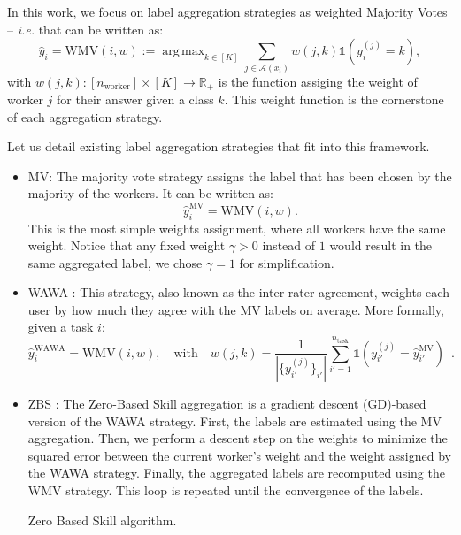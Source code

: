 \documentclass{cap2024}
\DeclareMathOperator*{\argmax}{arg\,max}
\begin{document}
In this work, we focus on label aggregation strategies as weighted Majority Votes \citep{littlestone1994weighted} -- \emph{i.e.} that can be written as:
\begin{equation}
  \label{eq:wmv_general}
  \hat{y}_i = \text{WMV}(i, w):=\argmax_{k \in [K]} \sum_{j\in\mathcal{A}(x_i)} w(j,k) \mathds{1}(y_i^{(j)} = k),
\end{equation}
with $w(j,k): [n_\text{worker}]\times [K]\rightarrow \mathbb{R}_+$ is the function assiging the weight of worker $j$ for their answer given a class $k$. This weight function is the cornerstone of each aggregation strategy.

Let us detail existing label aggregation strategies that fit into this framework.
\begin{itemize}
  \item MV: The majority vote strategy assigns the label that has been chosen by the majority of the workers. It can be written as:
    \begin{equation}
      \label{eq:mv}
      \hat{y}_i^{\text{MV}} = \mathrm{WMV}(i, w).
    \end{equation}
    This is the most simple weights assignment, where all workers have the same weight. Notice that any fixed weight $\gamma>0$ instead of $1$ would result in the same aggregated label, we chose $\gamma=1$ for simplification.
    \item WAWA \citep{appen_wawa_2021}: This strategy, also known as the inter-rater agreement, weights each user by how much they agree with the MV labels on average. More formally, given a task $i$:
    \begin{equation}
      \hat{y}_i^\text{WAWA}= \mathrm{WMV}\left(i, w\right),\quad
      \text{with}\quad w(j, k) = \frac{1}{|\{y_{i'}^{(j)}\}_{i'}|} \sum_{i'=1}^{n_{\mathrm{task}}} \mathds{1}\left(y_{i'}^{(j)} = \hat{y}_{i'}^\text{MV}\right)\enspace.
    \end{equation}
    \item ZBS \citep{CrowdKit2023}: The Zero-Based Skill aggregation is a gradient descent (GD)-based version of the WAWA strategy.
    First, the labels are estimated using the MV aggregation. Then, we perform a descent step on the weights to minimize the squared error between the current worker's weight and the weight assigned by the WAWA strategy. Finally, the aggregated labels are recomputed using the WMV strategy. This loop is repeated until the convergence of the labels.
    \begin{algorithm}
      \caption{Zero Based Skill algorithm.}

\end{algorithm}
\end{itemize}
\end{document}
